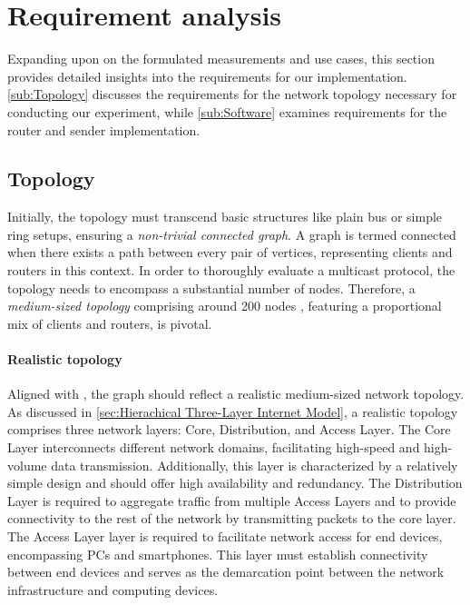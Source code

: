 
\section{Requirement analysis} %
\label{sec:Requirement_Analysis}
Expanding upon on the formulated measurements and use cases, this section
    provides detailed insights into the requirements for our implementation.
\autoref{sub:Topology} discusses the requirements for the network topology
    necessary for conducting our experiment, while \autoref{sub:Software}
    examines requirements for the router and sender implementation.

\subsection{Topology} %
\label{sub:Topology}
Initially, the topology must transcend basic structures like plain bus or simple
    ring setups, ensuring a \textit{non-trivial connected graph}.
A graph is termed connected when there exists a path between every pair of
    vertices, representing clients and routers in this context.
In order to thoroughly evaluate a multicast protocol, the topology needs to
    encompass a substantial number of nodes.
Therefore, a \textit{medium-sized topology} comprising around 200 nodes
    \cite{cisco_net_size}, featuring a proportional mix of clients and routers,
    is pivotal.

\paragraph{Realistic topology} %
\label{par:Realistic topology}
Aligned with \textit{\rqi{}}, the graph should reflect a realistic medium-sized
    network topology.
As discussed in \autoref{sec:Hierachical Three-Layer Internet Model}, a
    realistic topology comprises three network layers: Core, Distribution, and
    Access Layer.
The Core Layer interconnects different network domains, facilitating high-speed
    and high-volume data transmission.
Additionally, this layer is characterized by a relatively simple design and
    should offer high availability and redundancy.
The Distribution Layer is required to aggregate traffic from multiple Access
    Layers and to provide connectivity to the rest of the network by
    transmitting packets to the core layer.
The Access Layer layer is required to facilitate network access for end
    devices, encompassing PCs and smartphones.
This layer must establish connectivity between end devices and serves as the
    demarcation point between the network infrastructure and computing devices.


